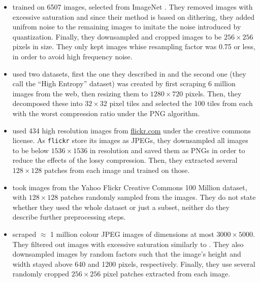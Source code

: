 \documentclass{article}
\begin{document}
\begin{itemize}
\item \cite{balle2016end} trained on 6507 images, selected from ImageNet
  \cite{deng2009imagenet}. They removed images with excessive saturation and
  since their method is based on dithering, they added unifrom noise to the
  remaining images to imitate the noise introduced by quantization. Finally,
  they downsampled and cropped images to be $256 \times 256$ pixels in size.
  They only kept images whise resampling factor was 0.75 or less, in order to
  avoid high frequency noise.
\item \cite{toderici2017full}
  used two datasets, first the one they described in \cite{toderici2015variable}
  and the second one (they call the ``High Entropy'' dataset) was created by
  first scraping 6 million images from the web, then resizing them to $1280
  \times 720$ pixels. Then, they decomposed these into $32 \times 32$ pixel
  tiles and selected the 100 tiles from each with the worst compression ratio under
  the PNG algorithm.
\item \cite{theis2017lossy} used 434 high resolution images from \url{flickr.com}
  under the creative commons license. As \texttt{flickr} store its images as
  JPEGs, they downsampled all images to be below $1536 \times 1536$ in
  resolution and saved them as PNGs in order to reduce the effects of the lossy
  compression. Then, they extracted several $128 \times 128$ patches from each
  image and trained on those.
\item \cite{rippel2017real} took images from the Yahoo Flickr Creative Commons
  100 Million dataset, with $128 \times 128$ patches randomly sampled from the
  images. They do not state whether they used the whole dataset or just a
  subset, neither do they describe further preprocessing steps.
\item \cite{balle2018variational} scraped $\approx$ 1 million colour JPEG images
  of dimensions at most $3000 \times 5000$. They filtered out images with
  excessive saturation similarly to \cite{balle2016end}. They also
  downsampled images by random factors such that the image's height and width
  stayed above 640 and 1200 pixels, respectively. Finally, they use several
  randomly cropped $256 \times 256$ pixel patches extracted from each image.
\end{itemize}
\end{document}

